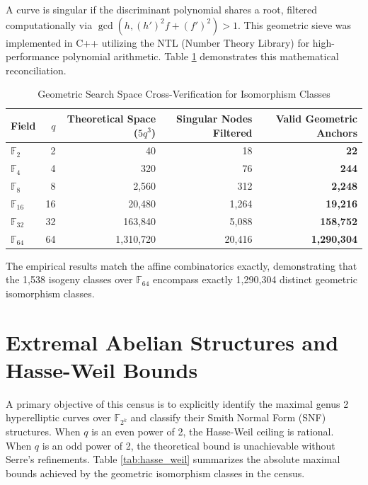 \documentclass[letterpaper, 11pt]{article}
\begin{document}
A curve is singular if the discriminant polynomial shares a root, filtered computationally via $\gcd(h, (h')^2f + (f')^2) > 1$. This geometric sieve was implemented in C++ utilizing the NTL (Number Theory Library) \cite{ShoupNTL} for high-performance polynomial arithmetic. Table \ref{tab:geometric_space} demonstrates this mathematical reconciliation.

\begin{table}[h]
    \centering
    \caption{Geometric Search Space Cross-Verification for Isomorphism Classes}
    \label{tab:geometric_space}
    \begin{tabular}{lrrrr}
        \toprule
        Field & $q$ & Theoretical Space ($5q^3$) & Singular Nodes Filtered & Valid Geometric Anchors \\
        \midrule
        $\mathbb{F}_2$ & 2 & 40 & 18 & \textbf{22} \\
        $\mathbb{F}_4$ & 4 & 320 & 76 & \textbf{244} \\
        $\mathbb{F}_8$ & 8 & 2,560 & 312 & \textbf{2,248} \\
        $\mathbb{F}_{16}$ & 16 & 20,480 & 1,264 & \textbf{19,216} \\
        $\mathbb{F}_{32}$ & 32 & 163,840 & 5,088 & \textbf{158,752} \\
        $\mathbb{F}_{64}$ & 64 & 1,310,720 & 20,416 & \textbf{1,290,304} \\
        \bottomrule
    \end{tabular}
\end{table}

The empirical results match the affine combinatorics exactly, demonstrating that the 1,538 isogeny classes over $\mathbb{F}_{64}$ encompass exactly 1,290,304 distinct geometric isomorphism classes. 

\section{Extremal Abelian Structures and Hasse-Weil Bounds}
A primary objective of this census is to explicitly identify the maximal genus 2 hyperelliptic curves over $\mathbb{F}_{2^k}$ and classify their Smith Normal Form (SNF) structures. When $q$ is an even power of 2, the Hasse-Weil ceiling is rational. When $q$ is an odd power of 2, the theoretical bound is unachievable without Serre's refinements. Table \ref{tab:hasse_weil} summarizes the absolute maximal bounds achieved by the geometric isomorphism classes in the census.
\end{document}
